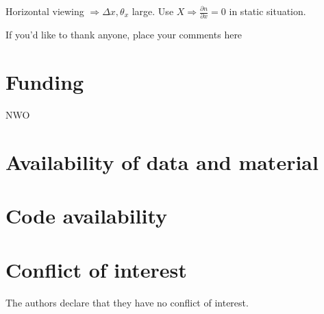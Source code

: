 \documentclass{svjour3}                     %
\begin{document}
Horizontal viewing $\Rightarrow \Delta x, \theta_x$ large. Use $X \Rightarrow \frac{\partial n}{\partial x} = 0$ in static situation.
\begin{acknowledgements}
If you'd like to thank anyone, place your comments here
\end{acknowledgements}

\section*{Funding}
NWO

\section*{Availability of data and material}

\section*{Code availability}

%
 \section*{Conflict of interest}
 The authors declare that they have no conflict of interest.

\printbibliography[heading=bibintoc]

%
%
\end{document}
